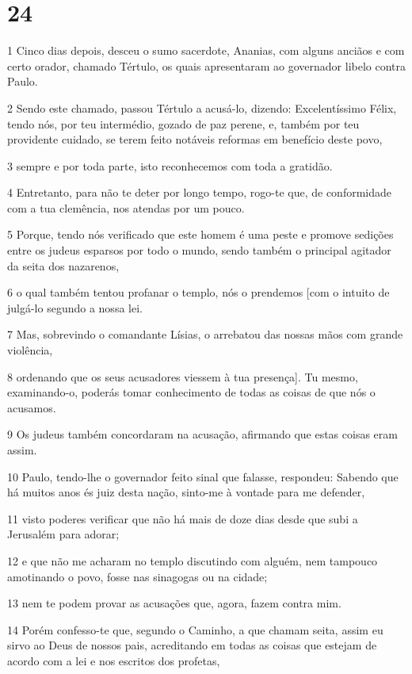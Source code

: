 \chapter{24}

\par 1 Cinco dias depois, desceu o sumo sacerdote, Ananias, com alguns anciãos e com certo orador, chamado Tértulo, os quais apresentaram ao governador libelo contra Paulo.
\par 2 Sendo este chamado, passou Tértulo a acusá-lo, dizendo: Excelentíssimo Félix, tendo nós, por teu intermédio, gozado de paz perene, e, também por teu providente cuidado, se terem feito notáveis reformas em benefício deste povo,
\par 3 sempre e por toda parte, isto reconhecemos com toda a gratidão.
\par 4 Entretanto, para não te deter por longo tempo, rogo-te que, de conformidade com a tua clemência, nos atendas por um pouco.
\par 5 Porque, tendo nós verificado que este homem é uma peste e promove sedições entre os judeus esparsos por todo o mundo, sendo também o principal agitador da seita dos nazarenos,
\par 6 o qual também tentou profanar o templo, nós o prendemos [com o intuito de julgá-lo segundo a nossa lei.
\par 7 Mas, sobrevindo o comandante Lísias, o arrebatou das nossas mãos com grande violência,
\par 8 ordenando que os seus acusadores viessem à tua presença]. Tu mesmo, examinando-o, poderás tomar conhecimento de todas as coisas de que nós o acusamos.
\par 9 Os judeus também concordaram na acusação, afirmando que estas coisas eram assim.
\par 10 Paulo, tendo-lhe o governador feito sinal que falasse, respondeu: Sabendo que há muitos anos és juiz desta nação, sinto-me à vontade para me defender,
\par 11 visto poderes verificar que não há mais de doze dias desde que subi a Jerusalém para adorar;
\par 12 e que não me acharam no templo discutindo com alguém, nem tampouco amotinando o povo, fosse nas sinagogas ou na cidade;
\par 13 nem te podem provar as acusações que, agora, fazem contra mim.
\par 14 Porém confesso-te que, segundo o Caminho, a que chamam seita, assim eu sirvo ao Deus de nossos pais, acreditando em todas as coisas que estejam de acordo com a lei e nos escritos dos profetas,
